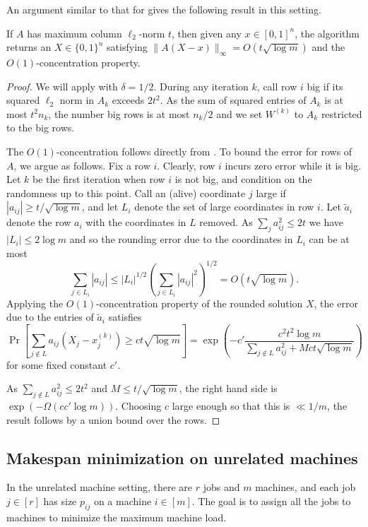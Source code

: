 \documentclass{toc}
\begin{document}
An argument similar to that for  gives the following result in this setting.
\begin{theorem} If $A$ has maximum column $\ell_2$-norm  $t$, then given any $x\in [0,1]^n$, the algorithm returns an $X\in \{0,1\}^n$ satisfying $\|A(X-x)\|_\infty =O(t \sqrt{\log m})$ and the $O(1)$-concentration property.
\end{theorem}
\begin{proof} We will apply  with $\delta=1/2$.
During any iteration $k$, call
row $i$ big if its squared $\ell_2$ norm in $A_k$ exceeds $2t^2$. As the sum of squared entries of $A_k$ is at most $t^2 n_k$, the number big rows is at most $n_k/2$ and we set $W^{(k)}$ to $A_k$ restricted to the big rows.

The $O(1)$-concentration follows directly from . To bound the error for rows of $A$, we argue as follows. Fix a row $i$. Clearly, row $i$ incurs zero error while it is big. Let $k$ be the first iteration when row $i$ is not big, and condition on the randomness up to this point.
Call an (alive) coordinate $j$ large if $|a_{ij}| \geq t/\sqrt{\log m}$, and let $L_i$ denote the set of large coordinates in row $i$.
Let $\tilde{a}_i$ denote the row $a_i$ with the coordinates in $L$ removed.
As $\sum_j a_{ij}^2 \leq 2t$ we have $|L_i| \leq 2\log m$ and so
the rounding error due to the coordinates in $L_i$ can be at most
\[ \sum_{j \in L_i} |a_{ij}| \leq |L_i|^{1/2} (  \sum_{j \in L_i} |a_{ij}|^2)^{1/2}  = O(t \sqrt{\log m}).\]
Applying the $O(1)$-concentration property of the rounded solution $X$, the error due to the entries of $\tilde{a}_i$ satisfies   
\[ \Pr\left[ \sum_{j \notin L}  a_{ij} (X_j-x^{(k)}_j)  \geq   c t \sqrt{ \log m} \right]
 =   \exp\left(-c'\frac{c^2t^2\log m}{\sum_{j \notin L} a_{ij}^2  + Mct \sqrt{\log m}  }\right) \]
 for some fixed constant $c'$. 
 
 As $\sum_{j \notin L} a_{ij}^2 \leq 2 t^2  $ and $M \leq t/ \sqrt{\log m}$, the right hand side is $\exp(-\Omega(cc'\log m))$. Choosing $c$ large enough so that this is $\ll 1/m$, the result follows by a union bound over the rows.
\end{proof}

%
%

\subsection{Makespan minimization on unrelated machines}
\label{s:makespan}
In the unrelated machine setting, there are $r$ jobs and $m$ machines, and each job $j \in [r]$ has size $p_{ij}$ on a machine $i \in [m]$.
The goal is to assign all the jobs to machines to minimize the maximum machine load.
\end{document}
